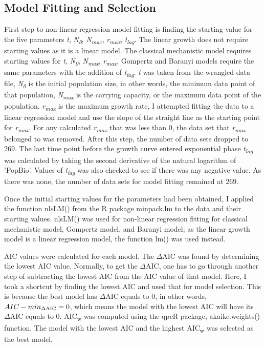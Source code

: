 \documentclass[11pt]{article}
\begin{document}
\subsection{Model Fitting and Selection}
First step to non-linear regression model fitting is finding the starting value for the five parameters \emph{t}, \emph{N\textsubscript{0}}, \emph{N\textsubscript{max}}, \emph{r\textsubscript{max}}, \emph{t\textsubscript{lag}}. The linear growth does not require starting values as it is a linear model. The classical mechanistic model requires starting values for \emph{t}, \emph{N\textsubscript{0}}, \emph{N\textsubscript{max}}, \emph{r\textsubscript{max}}, Gompertz and Baranyi models require the same parameters with the addition of \emph{t\textsubscript{lag}}.  \emph{t} was taken from the wrangled data file, \emph{N\textsubscript{0}} is the initial population size, in other words, the minimum data point of that population, \emph{N\textsubscript{max}} is the carrying capacity, or the maximum data point of the population. \emph{r\textsubscript{max}} is the maximum growth rate, I attempted fitting the data to a linear regression model and use the slope of the straight line as the starting point for \emph{r\textsubscript{max}}. For any calculated \emph{r\textsubscript{max}} that was less than 0, the data set that \emph{r\textsubscript{max}} belonged to was removed. After this step, the number of data sets dropped to 269. The last time point before the growth curve entered exponential phase \emph{t\textsubscript{lag}} was calculated by taking the second derivative of the natural logarithm of 'PopBio'. Values of \emph{t\textsubscript{lag}} was also checked to see if there was any negative value. As there was none, the number of data sets for model fitting remained at 269. 

Once the initial starting values for the parameters had been obtained, I applied the function nlsLM() from the R package minpack.lm to the data and their starting values. nlsLM() was used for non-linear regression fitting for classical mechanistic model, Gompertz model, and Baranyi model; as the linear growth model is a linear regression model, the function lm() was used instead. 

AIC values were calculated for each model. The $\Delta$AIC was found by determining the lowest AIC value. Normally, to get the $\Delta$AIC, one has to go through another step of subtracting the lowest AIC from the AIC value of that model. Here, I took a shortcut by finding the lowest AIC and used that for model selection. This is because the best model has $\Delta$AIC equals to 0, in other words, $AIC - {min\textsubscript{$\Delta$AIC}} = 0$, which means the model with the lowest AIC will have its $\Delta$AIC equals to 0. {AIC\textsubscript{w}} was computed using the qpcR package, akaike.weights() function. The model with the lowest AIC and the highest {AIC\textsubscript{w}} was selected as the best model.
\newpage
\end{document}
